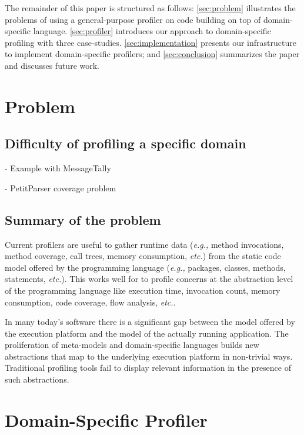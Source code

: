 \documentclass[runningheads]{llncs}
\newcommand{\eg}{\emph{e.g.,}\xspace}
\newcommand{\etc}{\emph{etc.}\xspace}
\newcommand{\seclabel}[1]{\label{sec:#1}}
\begin{document}
The remainder of this paper is structured as follows: \autoref{sec:problem} illustrates the problems of using a general-purpose profiler on code building on top of domain-specific language. \autoref{sec:profiler} introduces our approach to domain-specific profiling with three case-studies. \autoref{sec:implementation} presents our infrastructure to implement domain-specific profilers; and \autoref{sec:conclusion} summarizes the paper and discusses future work.

\section{Problem}\seclabel{problem}

\subsection{Difficulty of profiling a specific domain}

- Example with MessageTally

- PetitParser coverage problem

\subsection{Summary of the problem}

Current profilers are useful to gather runtime data (\eg method invocations, method coverage, call trees, memory consumption, \etc) from the static code model offered by the programming language (\eg packages, classes, methods, statements, \etc). This works well for to profile concerns at the abstraction level of the programming language like execution time, invocation count, memory consumption, code coverage, flow analysis, \etc.

In many today's software there is a significant gap between the model offered by the execution platform and the model of the actually running application. The proliferation of meta-models and domain-specific languages builds new abstractions that map to the underlying execution platform in non-trivial ways. Traditional profiling tools fail to display relevant information in the presence of such abstractions.


\section{Domain-Specific Profiler}\seclabel{profiler}
\end{document}

